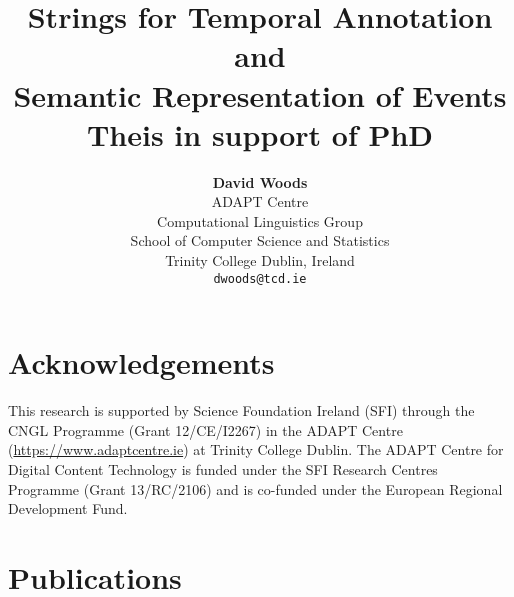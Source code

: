 \documentclass[a4paper,12pt,leqno]{article}
\title{\textbf{Strings for Temporal Annotation and\\Semantic Representation of Events}\\{\Large Theis in support of PhD}}
\author{\textbf{David Woods}\\
	ADAPT Centre\\
	Computational Linguistics Group\\
	School of Computer Science and Statistics\\
	Trinity College Dublin, Ireland\\
	\texttt{dwoods@tcd.ie}
}
\date{\parbox{\linewidth}{\centering%
		\today\endgraf\bigskip\bigskip\bigskip
		Supervised by: Tim Fernando, Carl Vogel}}
\begin{document}
\maketitle
\thispagestyle{empty}

\newpage
{}
\begin{abstract}
\noindent
\end{abstract}

\newpage
\section*{Acknowledgements}

This research is supported by Science Foundation Ireland (SFI) through the CNGL 
Programme (Grant 12/CE/I2267) in the ADAPT Centre 
(\url{https://www.adaptcentre.ie}) at Trinity College Dublin. The
ADAPT Centre for Digital Content Technology is funded under the SFI Research 
Centres Programme (Grant 13/RC/2106) and is co-funded under the European 
Regional Development Fund.

\newpage
\section*{Publications}
\end{document}
